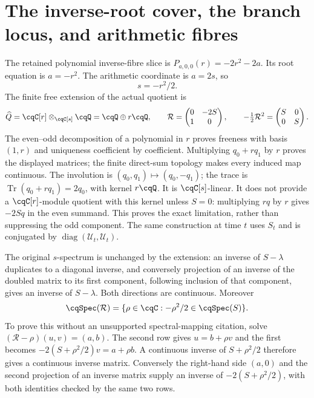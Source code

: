 \section{The inverse-root cover, the branch locus, and arithmetic fibres}
\label{sec:cq-cover}
The retained polynomial inverse-fibre slice is
$P_{a,0,0}(r)=-2r^2-2a$. Its root equation is $a=-r^2$.
The arithmetic coordinate is $a=2s$, so
\begin{equation}\label{eq:cq-cover}
 s=-r^2/2.
\end{equation}
The finite free extension of the actual quotient is
\[
 \widehat Q=\cqC[r]\otimes_{\cqC[s]}\cqQ
           =\cqQ\oplus r\cqQ,
 \qquad
 \mathcal R=\begin{pmatrix}0&-2S\\1&0\end{pmatrix},
 \qquad -\tfrac12\mathcal R^2=\begin{pmatrix}S&0\\0&S\end{pmatrix}.
\]
The even--odd decomposition of a polynomial in $r$ proves freeness
with basis $(1,r)$ and uniqueness coefficient by coefficient.
Multiplying $q_0+rq_1$ by $r$ proves the displayed matrices;
the finite direct-sum topology makes every induced map continuous.
The involution is $(q_0,q_1)\mapsto(q_0,-q_1)$; the trace is
$\operatorname{Tr}(q_0+rq_1)=2q_0$, with kernel $r\cqQ$.
It is $\cqC[s]$-linear. It does not provide a $\cqC[r]$-module
quotient with this kernel unless $S=0$: multiplying $rq$ by $r$
gives $-2Sq$ in the even summand. This proves the exact limitation,
rather than suppressing the odd component. The same construction
at time $t$ uses $S_t$ and is conjugated by
$\operatorname{diag}(\mathcal U_t,\mathcal U_t)$.

The original $s$-spectrum is unchanged by the extension: an inverse
of $S-\lambda$ duplicates to a diagonal inverse, and conversely
projection of an inverse of the doubled matrix to its first component,
following inclusion of that component, gives an inverse of
$S-\lambda$. Both directions are continuous. Moreover
\begin{equation}\label{eq:cq-rspec}
 \cqSpec(\mathcal R)
 =\{\rho\in\cqC:-\rho^2/2\in\cqSpec(S)\}.
\end{equation}
To prove this without an unsupported spectral-mapping citation,
solve $(\mathcal R-\rho)(u,v)=(a,b)$. The second row gives
$u=b+\rho v$ and the first becomes
$-2(S+\rho^2/2)v=a+\rho b$. A continuous inverse of
$S+\rho^2/2$ therefore gives a continuous inverse matrix.
Conversely the right-hand side $(a,0)$ and the second projection
of an inverse matrix supply an inverse of $-2(S+\rho^2/2)$,
with both identities checked by the same two rows.

